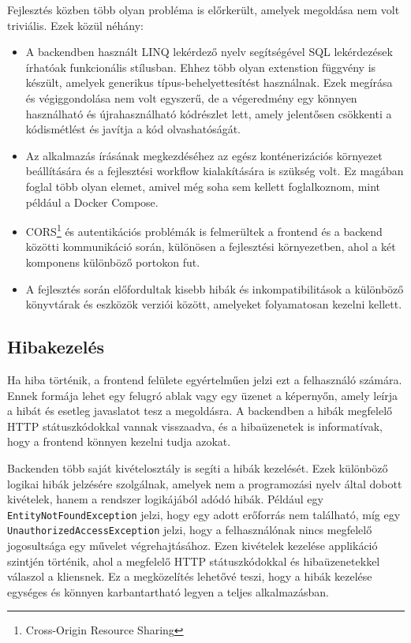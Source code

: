 Fejlesztés közben több olyan probléma is előrkerült, amelyek megoldása nem volt triviális.
Ezek közül néhány:
\begin{itemize}
    \item A backendben használt LINQ lekérdező nyelv segítségével SQL lekérdezések írhatóak funkcionális stílusban. Ehhez több olyan extenstion függvény is készült, amelyek generikus típus-behelyettesítést használnak. Ezek megírása és végiggondolása nem volt egyszerű, de a végeredmény egy könnyen használható és újrahasználható kódrészlet lett, amely jelentősen csökkenti a kódismétlést és javítja a kód olvashatóságát.
    \item Az alkalmazás írásának megkezdéséhez az egész konténerizációs környezet beállítására és a fejlesztési workflow kialakítására is szükség volt. Ez magában foglal több olyan elemet, amivel még soha sem kellett foglalkoznom, mint például a Docker Compose.
    \item CORS\footnote{Cross-Origin Resource Sharing} és autentikációs problémák is felmerültek a frontend és a backend közötti kommunikáció során, különösen a fejlesztési környezetben, ahol a két komponens különböző portokon fut.
    \item A fejlesztés során előfordultak kisebb hibák és inkompatibilitások a különböző könyvtárak és eszközök verziói között, amelyeket folyamatosan kezelni kellett.
\end{itemize}

\subsection{Hibakezelés}

Ha hiba történik, a frontend felülete egyértelműen jelzi ezt a felhasználó számára. Ennek formája lehet egy felugró ablak vagy egy üzenet a képernyőn, amely leírja a hibát és esetleg javaslatot tesz a megoldásra. A backendben a hibák megfelelő HTTP státuszkódokkal vannak visszaadva, és a hibaüzenetek is informatívak, hogy a frontend könnyen kezelni tudja azokat.

Backenden több saját kivételosztály is segíti a hibák kezelését. Ezek különböző logikai hibák jelzésére szolgálnak, amelyek nem a programozási nyelv által dobott kivételek, hanem a rendszer logikájából adódó hibák. Például egy \texttt{EntityNotFoundException} jelzi, hogy egy adott erőforrás nem található, míg egy \texttt{UnauthorizedAccessException} jelzi, hogy a felhasználónak nincs megfelelő jogosultsága egy művelet végrehajtásához. Ezen kivételek kezelése applikáció szintjén történik, ahol a megfelelő HTTP státuszkódokkal és hibaüzenetekkel válaszol a kliensnek. Ez a megközelítés lehetővé teszi, hogy a hibák kezelése egységes és könnyen karbantartható legyen a teljes alkalmazásban.


